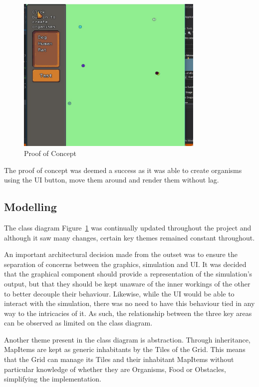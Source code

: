 \documentclass{ueacmpstyle}
\begin{document}
\begin{figure}[H]
	\caption{Proof of Concept}\label{classdiagram}
	\centering
	\includegraphics[width=0.8\textwidth]{poc}
\end{figure}

The proof of concept was deemed a success as it was able to create organisms using the UI button, move them around and render them without lag.
\subsection{Modelling}
The class diagram Figure~\ref{classdiagram} was continually updated throughout the project and although it saw many changes, certain key themes remained constant throughout.

An important architectural decision made from the outset was to ensure the separation of concerns between the graphics, simulation and UI. It was decided that the graphical component should provide a representation of the simulation's output, but that they should be kept unaware of the inner workings of the other to better decouple their behaviour. Likewise, while the UI would be able to interact with the simulation, there was no need to have this behaviour tied in any way to the intricacies of it. As such, the relationship between the three key areas can be observed as limited on the class diagram.

Another theme present in the class diagram is abstraction. Through inheritance, MapItems are kept as generic inhabitants by the Tiles of the Grid. This means that the Grid can manage its Tiles and their inhabitant MapItems without particular knowledge of whether they are Organisms, Food or Obstacles, simplifying the implementation.
\end{document}
